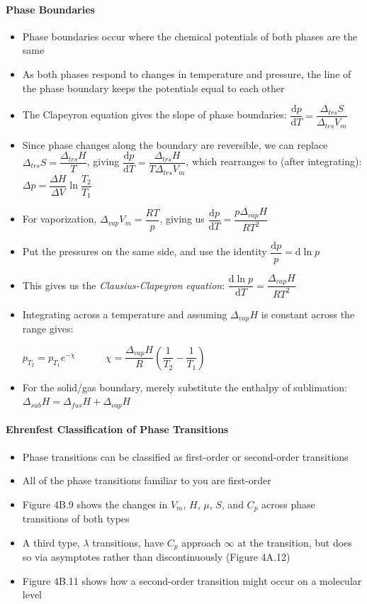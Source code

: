 \documentclass[12pt, openany, letterpaper]{memoir}
\begin{document}
\paragraph{Phase Boundaries}
\begin{itemize}
	\item Phase boundaries occur where the chemical potentials of both phases are the same
	\item As both phases respond to changes in temperature and pressure, the line of the phase boundary keeps the potentials equal to each other
	\item The Clapeyron equation gives the slope of phase boundaries: $\dfrac{\mathrm{d}p}{\mathrm{d}T}=\dfrac{\Delta_{trs}S}{\Delta_{trs}V_m}$
  \item Since phase changes along the boundary are reversible, we can replace $\Delta_{trs}S=\dfrac{\Delta_{trs}H}{T}$, giving $\dfrac{\mathrm{d}p}{\mathrm{d}T}= \dfrac{\Delta_{trs}H}{T\Delta_{trs}V_m}$, which rearranges to (after integrating): $\Delta p = \dfrac{\Delta H}{\Delta V}\ln\dfrac{T_2}{T_1}$
	\item For vaporization, $\Delta_{vap}V_m = \dfrac{RT}{p}$, giving us $\dfrac{\mathrm{d}p}{\mathrm{d}T}= \dfrac{p\Delta_{vap}H}{RT^2}$
	\item Put the pressures on the same side, and use the identity $\dfrac{\mathrm{d}p}{p}=\mathrm{d}\ln p$
	\item This gives us the \emph{Clausius-Clapeyron equation}: $\dfrac{\mathrm{d}\ln p}{\mathrm{d}T} =\dfrac{\Delta_{vap}H}{RT^2}$
	\item Integrating across a temperature and assuming $\Delta_{vap} H$ is constant across the range gives:

	      $p_{T_2} = p_{T_1}e^{-\chi} \hspace{3em} \chi = \dfrac{\Delta_{vap}H}{R}\left(\dfrac{1}{T_2}-\dfrac{1}{T_1}\right)$
	\item For the solid/gas boundary, merely substitute the enthalpy of sublimation: $\Delta_{sub}H = \Delta_{fus}H+\Delta_{vap}H$
\end{itemize}
\paragraph{Ehrenfest Classification of Phase Transitions}
\begin{itemize}
	\item Phase transitions can be classified as first-order or second-order transitions
	\item All of the phase transitions familiar to you are first-order
	\item Figure 4B.9 shows the changes in $V_m$, $H$, $\mu$, $S$, and $C_p$ across phase transitions of both types
	\item A third type, $\lambda$ transitions, have $C_p$ approach $\infty$ at the transition, but does so via asymptotes rather than discontinuously (Figure 4A.12)
	\item Figure 4B.11 shows how a second-order transition might occur on a molecular level
\end{itemize}
\end{document}
